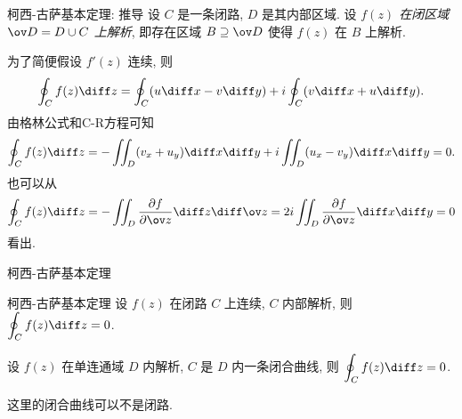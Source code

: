 \begin{frame}{柯西-古萨基本定理: 推导}
	\onslide<+->
	设 $C$ 是一条闭路, $D$ 是其内部区域.
	\onslide<+->
	设 \emph{$f(z)$ 在闭区域 $\ov D=D\cup C$ 上解析},
	\onslide<+->
	即存在区域 $B\supseteq\ov D$ 使得 $f(z)$ 在 $B$ 上解析.

	\onslide<+->
	为了简便假设 $f'(z)$ 连续,
	\onslide<+->
	则
	\[\oint_Cf(z)\diff z=\oint_C(u\diff x-v\diff y)
	+i\oint_C(v\diff x+u\diff y).\]
	\onslide<+->
	由格林公式和C-R方程可知
	\[\oint_Cf(z)\diff z=-\iint_D(v_x+u_y)\diff x\diff y
	+i\iint_D(u_x-v_y)\diff x\diff y=0.\]
	\onslide<+->
	也可以从
	\[\oint_Cf(z)\diff z=-\iint_D\frac{\partial f}{\partial \ov z}\diff z\diff \ov z=2i\iint_D\frac{\partial f}{\partial \ov z}\diff x\diff y=0\]
	看出.
\end{frame}


\begin{frame}{柯西-古萨基本定理}
	\onslide<+->
	\begin{second}{柯西-古萨基本定理}
	设 $f(z)$ 在闭路 $C$ 上连续, $C$ 内部解析, 则 $\displaystyle\oint_Cf(z)\diff z=0$.
	\end{second}

	\onslide<+->
	\begin{corollary}
	设 $f(z)$ 在\alert{单连通域} $D$ 内解析, $C$ 是 $D$ 内一条闭合曲线, 则 $\displaystyle\oint_Cf(z)\diff z=0$.
	\end{corollary}
	\onslide<+->
	这里的闭合曲线可以不是闭路.

\end{frame}


